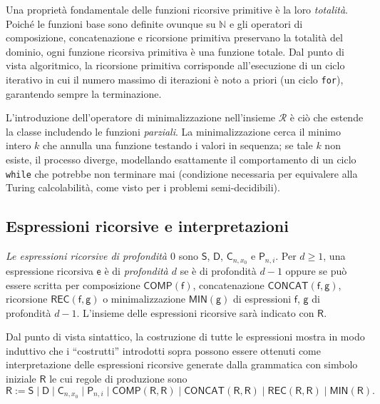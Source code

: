 \begin{rema}
Una proprietà fondamentale delle funzioni ricorsive primitive è la loro \emph{totalità}. Poiché le funzioni base sono definite ovunque su $\mathbb{N}$ e gli operatori di composizione, concatenazione e ricorsione primitiva preservano la totalità del dominio, ogni funzione ricorsiva primitiva è una funzione totale. Dal punto di vista algoritmico, la ricorsione primitiva corrisponde all'esecuzione di un ciclo iterativo in cui il numero massimo di iterazioni è noto a priori (un ciclo \texttt{for}), garantendo sempre la terminazione.

L'introduzione dell'operatore di minimalizzazione nell'insieme $\mathcal R$ è ciò che estende la classe includendo le funzioni \emph{parziali}. La minimalizzazione cerca il minimo intero $k$ che annulla una funzione testando i valori in sequenza; se tale $k$ non esiste, il processo diverge, modellando esattamente il comportamento di un ciclo \texttt{while} che potrebbe non terminare mai (condizione necessaria per equivalere alla Turing calcolabilità, come visto per i problemi semi-decidibili).
\end{rema}

\subsection{Espressioni ricorsive e interpretazioni}

\begin{defi}
\textit{Le espressioni ricorsive di profondità $0$} sono $\mathsf S$, 
$\mathsf D$, $\mathsf C_{n,x_0}$ e $\mathsf P_{n,i}$. 
Per $d\geq 1$, una espressione ricorsiva $\mathsf e$ è di 
\textit{profondità $d$} se è di profondità $d-1$ oppure se può essere scritta 
per composizione $\mathsf{COMP}(\mathsf f)$, 
concatenazione $\mathsf{CONCAT}(\mathsf f, \mathsf g)$, ricorsione $\mathsf{REC}(\mathsf f, \mathsf g)$
o minimalizzazione $\mathsf{MIN}(\mathsf g)$  di espressioni $\mathsf f$, $\mathsf g$ di profondità $d-1$.
L'insieme delle espressioni ricorsive sarà indicato con $\mathsf R$. 
\end{defi}

\begin{rema}
Dal punto di vista sintattico, la costruzione di tutte le espressioni mostra in modo induttivo che i ``costrutti'' introdotti sopra possono essere ottenuti come interpretazione delle espressioni ricorsive generate dalla grammatica con simbolo iniziale $\mathsf R$ le cui regole di produzione sono
\[
\mathsf R:=\mathsf S\mid\mathsf D\mid\mathsf C_{n,x_0}\mid\mathsf P_{n,i}\mid\mathsf{COMP}(\mathsf R,\mathsf R)\mid\mathsf{CONCAT}(\mathsf R,\mathsf R)\mid\mathsf{REC}(\mathsf R,\mathsf R)\mid\mathsf{MIN}(\mathsf R).
\]
\end{rema}


